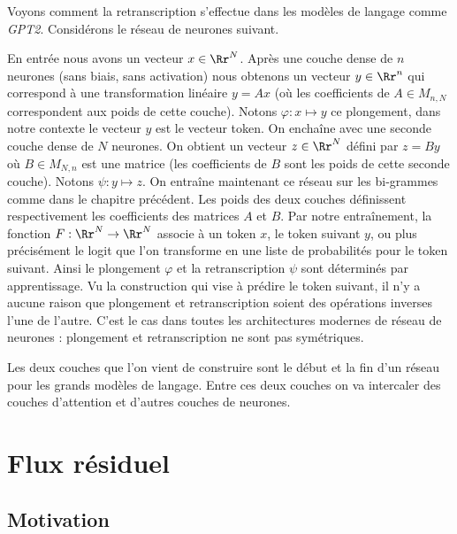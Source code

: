 \documentclass[11pt,class=report,crop=false]{standalone}
\begin{document}
Voyons comment la retranscription s'effectue dans les modèles de langage comme \emph{GPT2}.
Considérons le réseau de neurones suivant.


En entrée nous avons un vecteur $x \in \Rr^N$. Après une couche dense de $n$ neurones (sans biais, sans activation) nous obtenons un vecteur $y \in \Rr^n$ qui correspond à une transformation linéaire $y  = Ax$ (où les coefficients de $A \in M_{n,N}$ correspondent aux poids de cette couche). Notons $\varphi : x \mapsto y$ ce plongement, dans notre contexte le vecteur $y$ est le vecteur token.
On enchaîne avec une seconde couche dense de $N$ neurones. On obtient un vecteur $z \in \Rr^N$ défini par $z = B y$ où $B \in M_{N,n}$ est une matrice (les coefficients de $B$ sont les poids de cette seconde couche). Notons $\psi : y \mapsto z$.
On entraîne maintenant ce réseau sur les bi-grammes comme dans le chapitre précédent. Les poids des deux couches définissent respectivement les coefficients des matrices $A$ et $B$. 
Par notre entraînement, la fonction
$F : \Rr^N \to \Rr^N$ associe à un token $x$, le token suivant $y$, ou plus précisément le logit que l'on transforme en une liste de probabilités pour le token suivant.
Ainsi le plongement $\varphi$ et la retranscription $\psi$ sont déterminés par apprentissage.
Vu la construction qui vise à prédire le token suivant, il n'y a aucune raison que plongement et retranscription soient des opérations inverses l'une de l'autre. C'est le cas dans toutes les architectures modernes de réseau de neurones : plongement et retranscription ne sont pas symétriques.

Les deux couches que l'on vient de construire sont le début et la fin d'un réseau pour les grands modèles de langage. Entre ces deux couches on va intercaler des couches d'attention et d'autres couches de neurones.



\section{Flux résiduel}

\subsection{Motivation}
\end{document}
